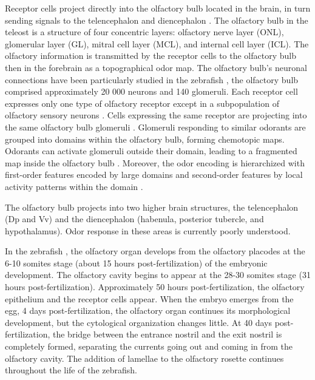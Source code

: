     Receptor cells project directly into the olfactory bulb located in the brain, in turn sending signals to the telencephalon and diencephalon \cite{miyasaka2009olfactory}. The olfactory bulb in the teleost is a structure of four concentric layers: olfactory nerve layer (ONL), glomerular layer (GL), mitral cell layer (MCL), and internal cell layer (ICL). The olfactory information is transmitted by the receptor cells to the olfactory bulb \cite{nikonov2001electrophysiological} then in the forebrain \cite{nikonov2005beyond} as a topographical odor map. The olfactory bulb's neuronal connections have been particularly studied in the zebrafish \cite{hansen1998peripheral,kermen2013neural}, the olfactory bulb comprised approximately 20 000 neurons \cite{friedrich2009processing} and 140 glomeruli\cite{braubach2012distribution}. Each receptor cell expresses only one type of olfactory receptor \cite{serizawa2004one,barth1997noncoordinate,weth1996nested,sato2007hierarchical} except in a subpopulation of olfactory sensory neurons \cite{sato2007hierarchical}. Cells expressing the same receptor are projecting into the same olfactory bulb glomeruli \cite{sato2005mutually}. Glomeruli responding to similar odorants are grouped into domains within the olfactory bulb, forming chemotopic maps. Odorants can activate glomeruli outside their domain, leading to a fragmented map inside the olfactory bulb \cite{friedrich1998chemotopic}. Moreover, the odor encoding is hierarchized with first-order features encoded by large domains and second-order features by local activity patterns within the domain \cite{fuss2001odorant,korsching2001odor}.

    The olfactory bulb projects into two higher brain structures, the telencephalon (Dp and Vv) and the diencephalon (habenula, posterior tubercle, and hypothalamus). Odor response in these areas is currently poorly understood.

    In the zebrafish \cite{hansen1993development,miyasaka2013functional}, the olfactory organ develops from the olfactory placodes at the 6-10 somites stage (about 15 hours post-fertilization) of the embryonic development. The olfactory cavity begins to appear at the 28-30 somites stage (31 hours post-fertilization). Approximately 50 hours post-fertilization, the olfactory epithelium and the receptor cells appear. When the embryo emerges from the egg, 4 days post-fertilization, the olfactory organ continues its morphological development, but the cytological organization changes little. At 40 days post-fertilization, the bridge between the entrance nostril and the exit nostril is completely formed, separating the currents going out and coming in from the olfactory cavity. The addition of lamellae to the olfactory rosette continues throughout the life of the zebrafish.

